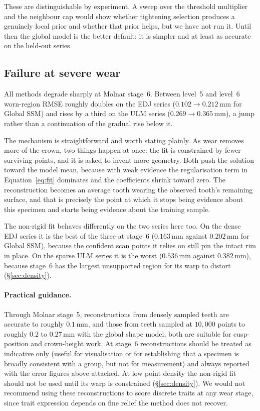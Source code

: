\documentclass[10pt,a4paper,twocolumn]{article}
\newcommand{\mm}{\,\mathrm{mm}}
\begin{document}
These are distinguishable by experiment. A sweep over the threshold multiplier and
the neighbour cap would show whether tightening selection produces a genuinely
local prior and whether that prior helps, but we have not run it. Until then the
global model is the better default: it is simpler and at least as accurate on the
held-out series.

\subsection{Failure at severe wear}
\label{sec:severe}

All methods degrade sharply at Molnar stage~6. Between level~5 and level~6
worn-region RMSE roughly doubles on the EDJ series ($0.102 \to 0.212\mm$ for
Global SSM) and rises by a third on the ULM series ($0.269 \to 0.365\mm$), a jump
rather than a continuation of the gradual rise below it.

The mechanism is straightforward and worth stating plainly. As wear removes more
of the crown, two things happen at once: the fit is constrained by fewer
surviving points, and it is asked to invent more geometry. Both push the solution
toward the model mean, because with weak evidence the regularisation term in
Equation~\eqref{eq:fit} dominates and the coefficients shrink toward zero. The
reconstruction becomes an average tooth wearing the observed tooth's remaining
surface, and that is precisely the point at which it stops being evidence about
this specimen and starts being evidence about the training sample.

The non-rigid fit behaves differently on the two series here too. On the dense
EDJ series it is the best of the three at stage~6 ($0.163\mm$ against $0.202\mm$
for Global SSM), because the confident scan points it relies on still pin the
intact rim in place. On the sparse ULM series it is the worst ($0.536\mm$ against
$0.382\mm$), because stage~6 has the largest unsupported region for its warp to
distort (\S\ref{sec:density}).

\paragraph{Practical guidance.}
Through Molnar stage~5, reconstructions from densely sampled teeth are accurate to
roughly $0.1\mm$, and those from teeth sampled at $10{,}000$ points to roughly
$0.2$ to $0.27\mm$ with the global shape model; both are suitable for
cusp-position and crown-height work. At stage~6 reconstructions should be treated
as indicative only (useful for visualisation or for establishing that a specimen
is broadly consistent with a group, but not for measurement) and always reported
with the error figures above attached. At low point density the non-rigid fit
should not be used until its warp is constrained (\S\ref{sec:density}). We would
not recommend using these reconstructions to score discrete traits at any wear
stage, since trait expression depends on fine relief the method does not recover.
\end{document}

